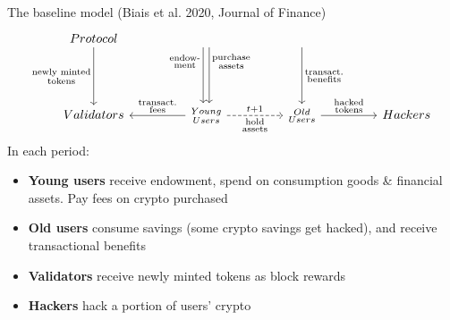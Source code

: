 \documentclass{beamer}
\begin{document}
\begin{frame}{The baseline model (Biais et al. 2020, Journal of Finance)}
\[
\begin{tikzcd}[ampersand replacement=\&, column sep = 4.5em, row sep = 4.5em]
Protocol 
\ar[d, "\substack{\text{newly minted}\\\text{tokens}}" ']
\&
\ar[d, shift right, "\substack{\text{endow-}\\ \text{ment}}" 'near start]
\ar[d, shift left, "\substack{\text{purchase}\\ \text{assets}}" near start]
\&
\ar[d, "\substack{\text{transact.}\\ \text{benefits}}" ]
\&
\\
Validators
\& 
\substack{Young\\Users}
\ar[l,"\substack{\text{transact.}\\ \text{fees}}" ']
\ar[r, dashed, "t+1", 
"\substack{\text{hold}\\\text{assets}}" ']
\& 
\substack{Old\\Users}
\ar[r, "\substack{\text{hacked}\\ \text{tokens}}"]
\&
Hackers
\end{tikzcd}
\]
In each period: %
\begin{itemize}
    \item \textbf{Young users} receive endowment, spend on consumption goods \& financial assets. Pay fees on crypto purchased
    \item \textbf{Old users} consume savings (some crypto savings get hacked), and receive transactional benefits
    \item \textbf{Validators} receive newly minted tokens as block rewards
    \item \textbf{Hackers} hack a portion of users' crypto
\end{itemize}
\end{frame}
\end{document}
